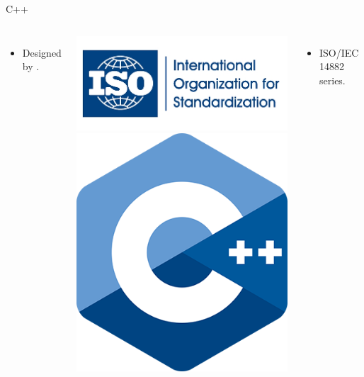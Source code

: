 \begin{frame}[t]{C++}
\begin{columns}[T]
\begin{itemize}
  \item Designed by .
\end{itemize}

\pause
\includegraphics[width=.5\textwidth]{images/logo-iso.png}
\includegraphics[width=.2\textwidth]{images/logo-cpp.png}

\begin{itemize}
  \item ISO/IEC 14882 series.
\end{itemize}


\end{columns}
\end{frame}
